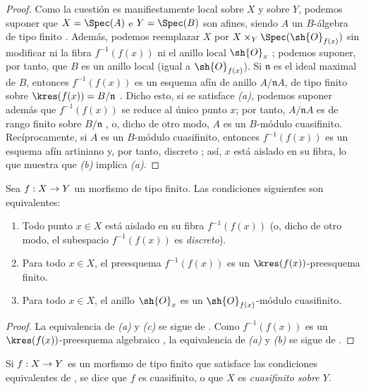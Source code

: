 \documentclass[oneside,10pt]{amsart}
\makeatletter
\newcommand{\ega@arrow}[2]{\mathchoice{#1}{#2}{#2}{#2}}
\renewcommand{\to}{\ega@arrow{\longrightarrow}{\rightarrow}}
\let\EGAOriginalLabel\label
\renewcommand{\label}[1]{\phantomsection\EGAOriginalLabel{#1}}
\makeatother
\begin{document}
\begin{proof}
Como la cuestión es manifiestamente local sobre $X$ y sobre $Y$, podemos suponer que $X=\Spec(A)$ e $Y=\Spec(B)$ son afines, siendo $A$ un $B$-álgebra de tipo finito .
Además, podemos reemplazar $X$ por $X\times_Y\Spec(\sh{O}_{f(x)})$ sin modificar ni la fibra $f^{-1}(f(x))$ ni el anillo local $\sh{O}_x$ ;
podemos suponer, por tanto, que $B$ es un anillo local (igual a $\sh{O}_{f(x)}$).
Si $\mathfrak{n}$ es el ideal maximal de $B$, entonces $f^{-1}(f(x))$ es un esquema afín de anillo $A/\mathfrak{n}A$, de tipo finito sobre $\kres(f(x))=B/\mathfrak{n}$ .
Dicho esto, si se satisface \emph{(a)}, podemos suponer además que $f^{-1}(f(x))$ se reduce al único punto $x$;
por tanto, $A/\mathfrak{n}A$ es de rango finito sobre $B/\mathfrak{n}$ , o, dicho de otro modo, $A$ es un $B$-módulo cuasifinito.
Recíprocamente, si $A$ es un $B$-módulo cuasifinito, entonces $f^{-1}(f(x))$ es un esquema afín artiniano y, por tanto, discreto ;
así, $x$ está aislado en su fibra, lo que muestra que \emph{(b)} implica \emph{(a)}.
\end{proof}

\begin{corollary}[6.2.2]
\label{II.6.2.2}
Sea $f:X\to Y$ un morfismo de tipo finito.
Las condiciones siguientes son equivalentes:
\begin{enumerate}
  \item[{\rm(a)}] Todo punto $x\in X$ está aislado en su fibra $f^{-1}(f(x))$ \textup{(o, dicho de otro modo, el subespacio $f^{-1}(f(x))$ es \emph{discreto})}.
  \item[{\rm(b)}] Para todo $x\in X$, el preesquema $f^{-1}(f(x))$ es un $\kres(f(x))$-preesquema finito.
  \item[{\rm(c)}] Para todo $x\in X$, el anillo $\sh{O}_x$ es un $\sh{O}_{f(x)}$-módulo cuasifinito.
\end{enumerate}
\end{corollary}

\begin{proof}
La equivalencia de \emph{(a)} y \emph{(c)} se sigue de .
Como $f^{-1}(f(x))$ es un $\kres(f(x))$-preesquema algebraico , la equivalencia de \emph{(a)} y \emph{(b)} se sigue de .
\end{proof}

\begin{definition}[6.2.3]
\label{II.6.2.3}
Si $f:X\to Y$ es un morfismo de tipo finito que satisface las condiciones equivalentes de , se dice que $f$ es cuasifinito, o que $X$ es \emph{cuasifinito sobre $Y$}.
\end{definition}
\end{document}
